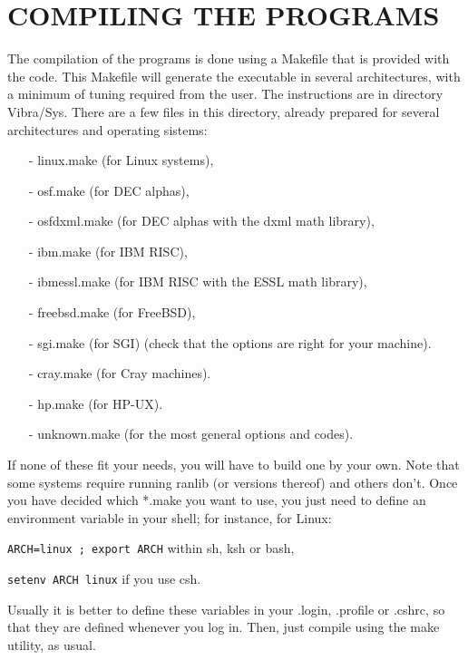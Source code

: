 \section{COMPILING THE PROGRAMS}

\noindent
The compilation of the programs is done using a Makefile
that is provided with the code.
This Makefile will generate the executable in several
architectures, with a  minimum of tuning required from the
user. The instructions are in directory Vibra/Sys.
There are a few files  in this directory,
already prepared for several architectures and
operating sistems: 
\begin{itemize}
\item[-] linux.make (for Linux systems),
\item[-] osf.make (for DEC alphas), 
\item[-] osfdxml.make (for DEC alphas with the dxml math library), 
\item[-] ibm.make (for IBM RISC), 
\item[-] ibmessl.make (for IBM RISC with the ESSL math library), 
\item[-] freebsd.make (for FreeBSD), 
\item[-] sgi.make (for SGI) 
      (check that the options are right for your machine).
\item[-] cray.make (for Cray machines).
\item[-] hp.make (for HP-UX).
\item[-] unknown.make (for the most general options and codes).
\end{itemize}
\noindent
If none of these fit your needs, you will have to build
one by your own. Note that some systems require running
ranlib (or versions thereof) and others don't.
Once you have decided which *.make you want to use,
you just need to define an environment variable
in your shell; for instance, for Linux:

\vspace{2pt}
{\tt ARCH=linux ; export ARCH} \hspace{1cm} within sh, ksh or bash,

\vspace{1pt}
{\tt setenv ARCH linux} \hspace{2.5cm} if you use csh.

\vspace{2pt}
\noindent
Usually it is better to define these variables in your
.login, .profile or .cshrc, so that they are defined
whenever you log in.
Then, just compile using the make utility, as usual.

